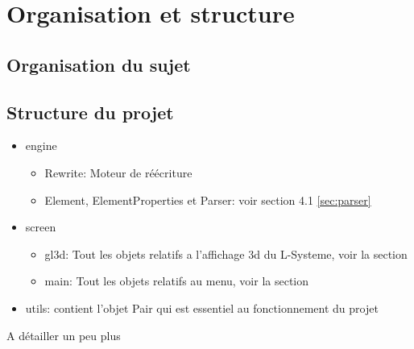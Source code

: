 \chapter{Organisation et structure}

\section{Organisation du sujet}

\section{Structure du projet}
\begin{itemize}
    \item engine
    \begin{itemize}
        \item Rewrite: Moteur de réécriture
        \item Element, ElementProperties et Parser: voir section 4.1 \ref{sec:parser}
    \end{itemize}
    \item screen
    \begin{itemize}
        \item gl3d: Tout les objets relatifs a l'affichage 3d du L-Systeme, voir la section \label{src:interface3d}
        \item main: Tout les objets relatifs au menu, voir la section \label{sec:menu}
    \end{itemize}
    \item utils: contient l'objet Pair qui est essentiel au fonctionnement du projet
\end{itemize}

A détailler un peu plus
